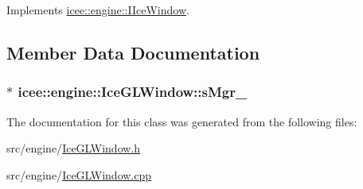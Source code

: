 Implements \hyperlink{classicee_1_1engine_1_1IIceWindow_a5f89b1a117bdeb33d0a932e30b19caa2}{icee::engine::IIceWindow}.



\subsection{Member Data Documentation}
\hypertarget{classicee_1_1engine_1_1IceGLWindow_aa829f931af2426ba4f136f1629f401ed}{
\subsubsection[{sMgr\_\-}]{$\ast$ {\bf icee::engine::IceGLWindow::sMgr\_\-}}}
\label{classicee_1_1engine_1_1IceGLWindow_aa829f931af2426ba4f136f1629f401ed}


The documentation for this class was generated from the following files:\begin{DoxyCompactItemize}
\item 
src/engine/\hyperlink{IceGLWindow_8h}{IceGLWindow.h}\item 
src/engine/\hyperlink{IceGLWindow_8cpp}{IceGLWindow.cpp}\end{DoxyCompactItemize}
